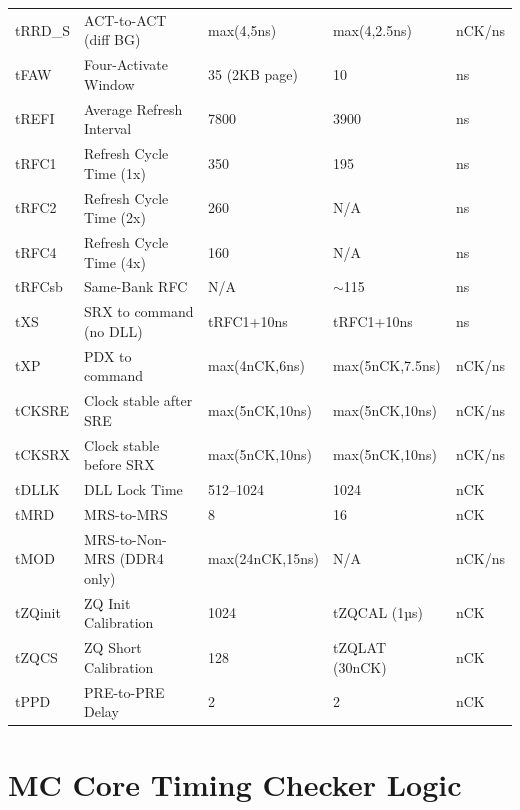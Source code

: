 \documentclass[11pt,a4paper]{article}
\begin{document}
{\begin{longtable}{L{2cm} L{5cm} R{2.2cm} R{2.2cm} L{1.5cm}}
tRRD\_S    & ACT-to-ACT (diff BG)         & max(4,5ns)        & max(4,2.5ns)       & nCK/ns \\
tFAW       & Four-Activate Window         & 35 (2KB page)     & 10                 & ns \\
tREFI      & Average Refresh Interval     & 7800              & 3900               & ns \\
tRFC1      & Refresh Cycle Time (1x)      & 350               & 195                & ns \\
tRFC2      & Refresh Cycle Time (2x)      & 260               & N/A                & ns \\
tRFC4      & Refresh Cycle Time (4x)      & 160               & N/A                & ns \\
tRFCsb     & Same-Bank RFC                & N/A               & $\sim$115          & ns \\
tXS        & SRX to command (no DLL)      & tRFC1+10ns        & tRFC1+10ns         & ns \\
tXP        & PDX to command               & max(4nCK,6ns)     & max(5nCK,7.5ns)    & nCK/ns \\
tCKSRE     & Clock stable after SRE       & max(5nCK,10ns)    & max(5nCK,10ns)     & nCK/ns \\
tCKSRX     & Clock stable before SRX      & max(5nCK,10ns)    & max(5nCK,10ns)     & nCK/ns \\
tDLLK      & DLL Lock Time                & 512--1024         & 1024               & nCK \\
tMRD       & MRS-to-MRS                   & 8                 & 16                 & nCK \\
tMOD       & MRS-to-Non-MRS (DDR4 only)   & max(24nCK,15ns)   & N/A                & nCK/ns \\
tZQinit    & ZQ Init Calibration          & 1024              & tZQCAL (1µs)       & nCK \\
tZQCS      & ZQ Short Calibration         & 128               & tZQLAT (30nCK)     & nCK \\
tPPD       & PRE-to-PRE Delay             & 2                 & 2                  & nCK \\
\end{longtable}
}

\section{MC Core Timing Checker Logic}
\end{document}
